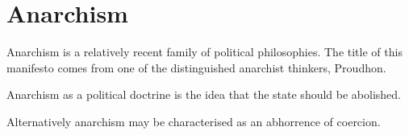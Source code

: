 
\section{Anarchism}\label{Anarchism}

Anarchism is a relatively recent family of political philosophies.
The title of this manifesto comes from one of the distinguished anarchist thinkers, Proudhon.

Anarchism as a political doctrine is the idea that the state should be abolished.

Alternatively anarchism may be characterised as an abhorrence of coercion.


